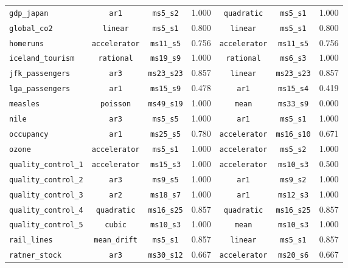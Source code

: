 \begin{table}[htbp]
{\begin{tabular}{lcccccc}
\texttt{gdp\_japan} & \texttt{ar1} & \texttt{ms5\_s2} & 1.000 & \texttt{quadratic} & \texttt{ms5\_s1} & 1.000\\
\texttt{global\_co2} & \texttt{linear} & \texttt{ms5\_s1} & 0.800 & \texttt{linear} & \texttt{ms5\_s1} & 0.800\\
\texttt{homeruns} & \texttt{accelerator} & \texttt{ms11\_s5} & 0.756 & \texttt{accelerator} & \texttt{ms11\_s5} & 0.756\\
\texttt{iceland\_tourism} & \texttt{rational} & \texttt{ms19\_s9} & 1.000 & \texttt{rational} & \texttt{ms6\_s3} & 1.000\\
\texttt{jfk\_passengers} & \texttt{ar3} & \texttt{ms23\_s23} & 0.857 & \texttt{linear} & \texttt{ms23\_s23} & 0.857\\
\texttt{lga\_passengers} & \texttt{ar1} & \texttt{ms15\_s9} & 0.478 & \texttt{ar1} & \texttt{ms15\_s4} & 0.419\\
\texttt{measles} & \texttt{poisson} & \texttt{ms49\_s19} & 1.000 & \texttt{mean} & \texttt{ms33\_s9} & 0.000\\
\texttt{nile} & \texttt{ar3} & \texttt{ms5\_s5} & 1.000 & \texttt{ar1} & \texttt{ms5\_s1} & 1.000\\
\texttt{occupancy} & \texttt{ar1} & \texttt{ms25\_s5} & 0.780 & \texttt{accelerator} & \texttt{ms16\_s10} & 0.671\\
\texttt{ozone} & \texttt{accelerator} & \texttt{ms5\_s1} & 1.000 & \texttt{accelerator} & \texttt{ms5\_s2} & 1.000\\
\texttt{quality\_control\_1} & \texttt{accelerator} & \texttt{ms15\_s3} & 1.000 & \texttt{accelerator} & \texttt{ms10\_s3} & 0.500\\
\texttt{quality\_control\_2} & \texttt{ar3} & \texttt{ms9\_s5} & 1.000 & \texttt{ar1} & \texttt{ms9\_s2} & 1.000\\
\texttt{quality\_control\_3} & \texttt{ar2} & \texttt{ms18\_s7} & 1.000 & \texttt{ar1} & \texttt{ms12\_s3} & 1.000\\
\texttt{quality\_control\_4} & \texttt{quadratic} & \texttt{ms16\_s25} & 0.857 & \texttt{quadratic} & \texttt{ms16\_s25} & 0.857\\
\texttt{quality\_control\_5} & \texttt{cubic} & \texttt{ms10\_s3} & 1.000 & \texttt{mean} & \texttt{ms10\_s3} & 1.000\\
\texttt{rail\_lines} & \texttt{mean\_drift} & \texttt{ms5\_s1} & 0.857 & \texttt{linear} & \texttt{ms5\_s1} & 0.857\\
\texttt{ratner\_stock} & \texttt{ar3} & \texttt{ms30\_s12} & 0.667 & \texttt{accelerator} & \texttt{ms20\_s6} & 0.667\\

\end{tabular}}
\end{table}
